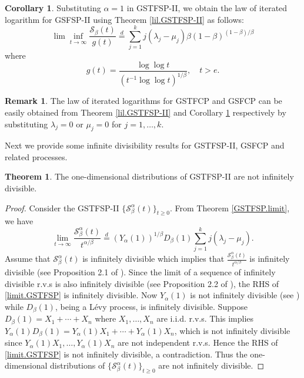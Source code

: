 \documentclass[11pt,oneside,reqno]{amsart}
\theoremstyle{definition}
\newtheorem{theorem}{\bf Theorem}[section]
\newtheorem{remark}{\bf Remark}[section]
\newtheorem{corollary}{Corollary}[section]
\theoremstyle{remarkstyle}
\begin{document}
\begin{corollary}\label{lil.GSFSP}
Substituting $\alpha=1$ in GSTFSP-II, we obtain the law of iterated logarithm for GSFSP-II using Theorem \ref{lil.GSTFSP-II} as follows:
\begin{equation*}
\lim\inf_{t\rightarrow\infty}\frac{\mathcal{S}_{\beta}(t)}{g(t)} \overset{d}{=} \sum_{j=1}^kj(\lambda_j-\mu_j)\beta(1-\beta)^{(1-\beta)/\beta}   
\end{equation*}
where
\begin{equation*}
g(t)=\frac{\log\log t}{(t^{-1}\log\log t)^{1/\beta}},\quad t>e.
\end{equation*}
\end{corollary}


\begin{remark}
The law of iterated logarithms for GSTFCP and GSFCP can be easily obtained from Theorem \ref{lil.GSTFSP-II} and Corollary \ref{lil.GSFSP} respectively by substituting $\lambda_j=0$ or $\mu_j=0$ for $j=1,\ldots,k$. 
\end{remark}
 
Next we provide some infinite divisibility results for GSTFSP-II, GSFCP and related processes. 
\begin{theorem}\label{id.GSTFSP}
The one-dimensional distributions of GSTFSP-II are not infinitely divisible.
\end{theorem}

\begin{proof}
Consider the GSTFSP-II $\{\mathcal{S}_{\beta}^{\alpha}(t)\}_{t\ge 0}$. From Theorem \ref{GSTFSP.limit}, we have
\begin{equation}\label{limit.GSTFSP}
\lim_{t\rightarrow\infty}\frac{\mathcal{S}_{\beta}^{\alpha}(t)}{t^{\alpha/\beta}} \overset{d}{=} (Y_\alpha(1))^{1/\beta}D_\beta(1)\sum_{j=1}^{k}j(\lambda_j-\mu_j).  
\end{equation}
Assume that $\mathcal{S}_{\beta}^{\alpha}(t)$ is infinitely divisible which implies that $\frac{\mathcal{S}_{\beta}^{\alpha}(t)}{t^{\alpha/\beta}}$ is infinitely divisible (see Proposition 2.1 of \citet{Steutel2004}). Since the limit of a sequence of infinitely divisible r.v.s is also infinitely divisible (see Proposition 2.2 of \citet{Steutel2004}), the RHS of \eqref{limit.GSTFSP} is infinitely divisible. Now $Y_\alpha(1)$ is not infinitely divisible (see \citet{Vellaisamy2018}) while $D_{\beta}(1)$, being a L\'{e}vy process, is infinitely divisible. Suppose $D_{\beta}(1)=X_1+\cdots + X_n$ where $X_1,\ldots,X_n$ are i.i.d. r.v.s. This implies $Y_{\alpha}(1)D_{\beta}(1)=Y_{\alpha}(1)X_1+\cdots + Y_{\alpha}(1)X_n$, which is not infinitely divisible since $Y_{\alpha}(1)X_1,\ldots, Y_{\alpha}(1)X_n$ are not independent r.v.s. Hence the RHS of \eqref{limit.GSTFSP} is not infinitely divisible, a contradiction. Thus the one-dimensional distributions of $\{\mathcal{S}_{\beta}^\alpha(t)\}_{t\geq 0}$ are not infinitely divisible. 
\end{proof}
\end{document}
